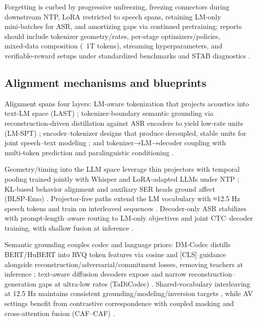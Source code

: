 Forgetting is curbed by progressive unfreezing, freezing connectors during downstream NTP, LoRA restricted to speech spans, retaining LM‑only mini‑batches for ASR, and amortizing gaps via continued pretraining; reports should include tokenizer geometry/rates, per‑stage optimizers/policies, mixed‑data composition (~1T tokens), streaming hyperparameters, and verifiable‑reward setups under standardized benchmarks and STAB diagnostics \cite{nguyen2025qwenvsgemmaintegrationwhispercomparative,hsu2024exploringcontextlearningtextlessspeechla,zeng2024scalingspeechtextpretrainingsyntheticint,vashishth2024stabspeechtokenizerassessmentbenchmark,entry2025indicsuperbspeechprocessinguniversalperf,sadok2025vectorquantizedmaskedautoencoderaudiovis,wang2025tadicodectextawarediffusionspeechtokeniz}.

\subsection{Alignment mechanisms and blueprints} \label{subsec:Alignment mechanisms and blueprints}
Alignment spans four layers: LM‑aware tokenization that projects acoustics into text‑LM space (LAST) \cite{turetzky2024lastlanguagemodelawarespeechtokenization}; tokenizer‑boundary semantic grounding via reconstruction‑driven distillation against ASR encoders to yield low‑rate units (LM‑SPT) \cite{jo2025lmsptalignedsemanticdistillationspeechto}; encoder–tokenizer designs that produce decoupled, stable units for joint speech–text modeling \cite{entry2025towardjointlanguagemodelingspeechunitste}; and tokenizer→LM→decoder coupling with multi‑token prediction and paralinguistic conditioning \cite{fan2025whatmakesgoodspeechtokenizerllmcentricge,wang2025incorporatingcontextualparalinguisticund}.

Geometry/timing into the LLM space leverage thin projectors with temporal pooling trained jointly with Whisper and LoRA‑adapted LLMs under NTP \cite{nguyen2025qwenvsgemmaintegrationwhispercomparative}; KL‑based behavior alignment and auxiliary SER heads ground affect (BLSP‑Emo) \cite{wang2024blspemotowardsempatheticlargespeechlangu}. Projector‑free paths extend the LM vocabulary with ≈12.5 Hz speech tokens and train on interleaved sequences \cite{zeng2024scalingspeechtextpretrainingsyntheticint}. Decoder‑only ASR stabilizes with prompt‑length–aware routing to LM‑only objectives and joint CTC–decoder training, with shallow fusion at inference \cite{tsunoo2024decoderonlyarchitecturespeechrecognition}.

Semantic grounding couples codec and language priors: DM‑Codec distills BERT/HuBERT into RVQ token features via cosine and [CLS] guidance alongside reconstruction/adversarial/commitment losses, removing teachers at inference \cite{ahasan2025dmcodecdistillingmultimodalrepresentatio}; text‑aware diffusion decoders expose and narrow reconstruction–generation gaps at ultra‑low rates (TaDiCodec) \cite{wang2025tadicodectextawarediffusionspeechtokeniz}. Shared‑vocabulary interleaving at 12.5 Hz maintains consistent grounding/modeling/inversion targets \cite{zeng2024scalingspeechtextpretrainingsyntheticint}, while AV settings benefit from contrastive correspondence with coupled masking and cross‑attention fusion (CAF–CAF) \cite{sadok2025vectorquantizedmaskedautoencoderaudiovis}.

